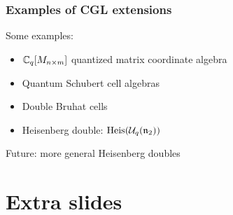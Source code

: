 \documentclass[aspectratio=169]{beamer}
\begin{document}
\begin{frame}
	\frametitle{Examples of CGL extensions}

	Some examples:
	\begin{itemize}
		\item $\mathbb{C}_q[M_{n\times m}]$ quantized matrix coordinate algebra
		\item Quantum Schubert cell algebras
		\item Double Bruhat cells \pause
		\item Heisenberg double: $\operatorname{Heis}(\mathcal{U}_q(\mathfrak{n}_2))$
	\end{itemize}
	\medskip
	\pause
	Future: more general Heisenberg doubles

\end{frame}

\appendix

\section{Extra slides}
\end{document}
